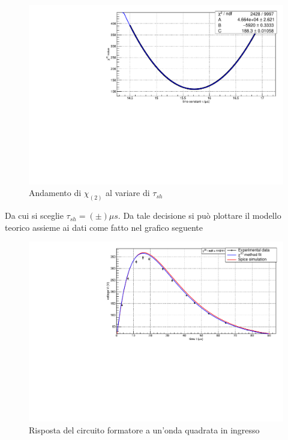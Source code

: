 \documentclass{article}
\begin{document}
\begin{center}
    \begin{figure}[H]
    \centering
    \includegraphics[scale=0.375, angle=0]{chi_forma_no_pz.pdf}
    \caption{Andamento di $\chi_{(2)}$ al variare di $\tau_{sh}$}
    \label{fig:chi_forma_no_pz}
    \end{figure}
\end{center}

Da cui si sceglie $\tau_{sh} = (\pm) \mu s$. Da tale decisione si può plottare il modello teorico assieme ai dati come fatto nel
grafico seguente

\begin{center}
    \begin{figure}[H]
    \centering
    \includegraphics[scale=0.375, angle=0]{forma_no_pz.pdf}
    \caption{Risposta del circuito formatore a un'onda quadrata in ingresso}
    \label{fig:forma_no_pz}
    \end{figure}
\end{center}
\end{document}
